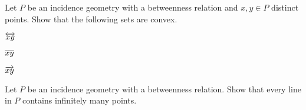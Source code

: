 \begin{exercise}
Let \(P\) be an incidence geometry with a betweenness relation and \(x,y \in P\) distinct points.
Show that the following sets are convex.
\begin{proplist}
\item \(\overleftrightarrow{xy}\)
\item \(\overline{xy}\)
\item \(\overrightarrow{xy}\)
\end{proplist}
\end{exercise}

\begin{exercise}
Let \(P\) be an incidence geometry with a betweenness relation.
Show that every line in \(P\) contains infinitely many points.
\end{exercise}
